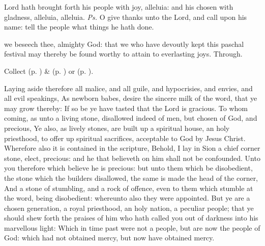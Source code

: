 \clearpage
{}


\introit
{} Lord hath brought forth his people with joy, alleluia: and his chosen with gladness, alleluia, alleluia. \textit{Ps.} O give thanks unto the Lord, and call upon his name: tell the people what things he hath done.

\collect
{} we beseech thee, almighty God: that we who have devoutly kept this paschal festival may thereby be found worthy to attain to everlasting joys. Through.
\begin{rubric}
     Collect  (p. \pageref{EasterCollect}) \&   (p. \pageref{SPAgainst}) or  (p. \pageref{SPChiefBishop}).
\end{rubric}

 Laying aside therefore all malice, and all guile, and hypocrisies, and envies, and all evil speakings, As newborn babes, desire the sincere milk of the word, that ye may grow thereby: If so be ye have tasted that the Lord is gracious. To whom coming, as unto a living stone, disallowed indeed of men, but chosen of God, and precious, Ye also, as lively stones, are built up a spiritual house, an holy priesthood, to offer up spiritual sacrifices, acceptable to God by Jesus Christ. Wherefore also it is contained in the scripture, Behold, I lay in Sion a chief corner stone, elect, precious: and he that believeth on him shall not be confounded. Unto you therefore which believe he is precious: but unto them which be disobedient, the stone which the builders disallowed, the same is made the head of the corner, And a stone of stumbling, and a rock of offence, even to them which stumble at the word, being disobedient: whereunto also they were appointed. But ye are a chosen generation, a royal priesthood, an holy nation, a peculiar people; that ye should shew forth the praises of him who hath called you out of darkness into his marvellous light: Which in time past were not a people, but are now the people of God: which had not obtained mercy, but now have obtained mercy.

